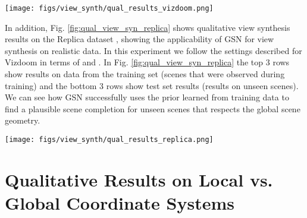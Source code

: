 \documentclass[10pt,twocolumn,letterpaper]{article}
\begin{document}
\begin{figure*}[h]
	\centering
	\texttt{[image: figs/view\_synth/qual\_results\_vizdoom.png]}
	\caption{Qualitative view synthesis results on Vizdoom sequences not seen during training. Given source views  we invert GSN to obtain a local latent code grid , which is then use both to reconstruct , denoted as , and also to predict target views  (given their camera poses) which are denoted as . Each row corresponds to a different set of source views . Frames highlighted in green are input to GSN, frames highlighted in blue are predictions.}
	\label{fig:qual_view_syn}
\end{figure*}

In addition, Fig. \ref{fig:qual_view_syn_replica} shows qualitative view synthesis results on the Replica dataset \cite{replica}, showing the applicability of GSN for view synthesis on realistic data. In this experiment we follow the settings described for Vizdoom in terms of  and . In Fig. \ref{fig:qual_view_syn_replica} the top 3 rows show results on data from the training set (\eg scenes that were observed during training) and the bottom 3 rows show test set results (\eg results on unseen scenes). We can see how GSN successfully uses the prior learned from training data to find a plausible scene completion for unseen scenes that respects the global scene geometry.

\begin{figure*}[h]
	\centering
	\texttt{[image: figs/view\_synth/qual\_results\_replica.png]}
	\caption{Qualitative view synthesis results on Replica. Given source views  we invert GSN to obtain a local latent code grid , which is then use both to reconstruct , denoted as , and also to predict target views  (given their camera poses) which are denoted as . Each row corresponds to a different set of source views  (top 3 rows are scenes from the training set, bottom 3 rows are scenes in a heldout test set). Frames highlighted in green are input to GSN, frames highlighted in blue are predictions.}
	\label{fig:qual_view_syn_replica}
\end{figure*}

\section{Qualitative Results on Local vs. Global Coordinate Systems} 
\end{document}

